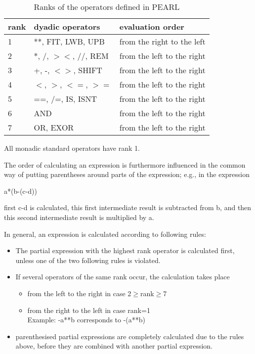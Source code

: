 \begin{table}
\begin{center}
\caption{Ranks of the operators defined in PEARL}
\label{ranks}
\vspace{5mm}
\begin{tabular}{|l@{\x}|l@{\x}|l|}
\hline
rank & dyadic operators       & evaluation order \\ \hline
1    & **, FIT, LWB, UPB      & from the right to the left\\
2    & *, /, $><$, //, REM    & from the left to the right\\
3    & +, -, $<>$, SHIFT      & from the left to the right\\
4    & $<$, $>$, $<=$, $>=$   & from the left to the right\\
5    & ==, /=, IS, ISNT       & from the left to the right\\
6    & AND                    & from the left to the right\\
7    & OR, EXOR               & from the left to the right\\
\hline
\end{tabular}
\end{center}
\end{table}

All monadic standard operators have rank 1.

The order of calculating an expression is furthermore influenced in the
common way of putting parentheses around parts of the expression; e.g.,
in the expression

a*(b-(c-d))

first c-d is calculated, this first intermediate result is subtracted
from b, and then this second intermediate result is multiplied by a.

In general, an expression is calculated according to following rules:
\begin{itemize}
\item The partial expression with the highest rank operator is
calculated first, unless one of the two following rules is violated.
\item If several operators of the same rank occur, the calculation takes
place
\begin{itemize}
\item from the left to the right in case 2$\ge$rank$\ge$7
\item from the right to the left in case rank=1\\
      Example: -a**b corresponds to -(a**b)
\end{itemize}
\item parenthesised partial expressions are completely calculated due to
the rules above, before they are combined with another partial
expression.
\end{itemize}

